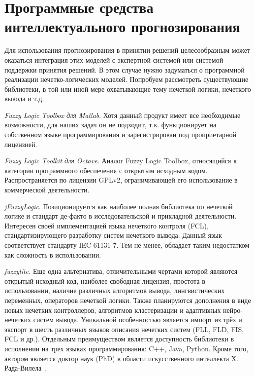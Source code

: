 \section{Программные средства интеллектуального прогнозирования}

Для использования прогнозирования в принятии решений целесообразным может
оказаться интеграция этих моделей с экспертной системой или системой поддержки
принятия решений.  В этом случае нужно задуматься о программной реализации
нечетко-логических моделей.  Попробуем рассмотреть существующие библиотеки, в
той или иной мере охватывающие тему нечеткой логики, нечеткого вывода и т.д.

\textit{Fuzzy Logic Toolbox для Matlab}. Хотя данный продукт имеет все
необходимые возможности, для наших задач он не подходит, т.к. функционирует на
собственном языке программирования и зарегистрирован под проприетарной лицензией.

\textit{Fuzzy Logic Toolkit для Octave.} Аналог Fuzzy Logic Toolbox, относящийся
к категории программного обеспечения с открытым исходным кодом. Распространяется
по лицензии GPLv2, ограничивающей его использование в коммерческой деятельности.

\textit{jFuzzyLogic}. Позиционируется как наиболее полная библиотека по нечеткой
логике и стандарт де-факто в исследовательской и прикладной деятельности.
Интересен своей имплементацией языка нечеткого контроля (FCL),
стандартизирующего разработку систем нечеткого вывода. Данный язык соответствует
стандарту IEC 61131-7. Тем не менее, обладает таким недостатком как сложность в
использовании.

\textit{fuzzylite.} Еще одна альтернатива, отличительными чертами которой
являются открытый исходный код, наиболее свободная лицензия, простота в
использовании, наличие различных алгоритмов вывода, лингвистических переменных,
операторов нечеткой логики. Также планируются дополнения в виде новых нечетких
контроллеров, алгоритмов кластеризации и адаптивных нейро-нечетких систем
вывода. Уникальной особенностью является импорт из трёх и экспорт в шесть
различных языков описания нечетких систем (FLL, FLD, FIS, FCL и др.).  Отдельным
преимуществом является доступность библиотеки в исполнении на трех языках
программирования: C++, Java, Python. Кроме того, автором является доктор наук
(PhD) в области искусственного интеллекта Х. Рада-Вилела~\cite{RadaVilela2014}.


